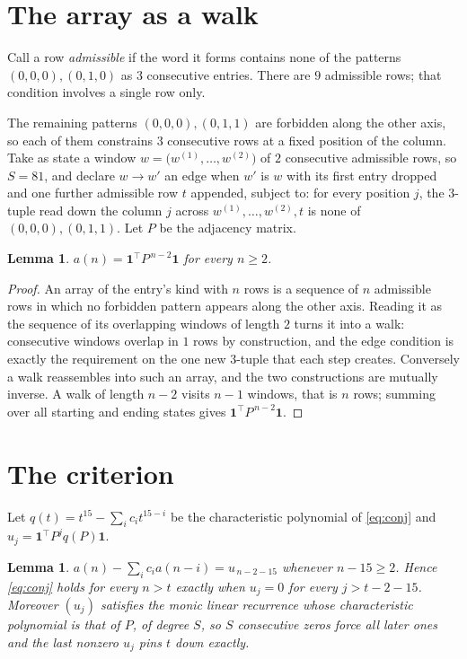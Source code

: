 \documentclass[11pt,a4paper]{article}
\theoremstyle{plain}
\newtheorem{lemma}[theorem]{Lemma}
\theoremstyle{definition}
\begin{document}
\section{The array as a walk}

Call a row \emph{admissible} if the word it forms contains none of the patterns
$(0,0,0), (0,1,0)$ as $3$ consecutive entries. There are $9$ admissible rows; that condition
involves a single row only.

The remaining patterns $(0,0,0), (0,1,1)$ are forbidden along the other axis, so each of them
constrains $3$ consecutive rows at a fixed position of the column. Take as state a
window $w=\bigl(w^{(1)},\dots,w^{(2)}\bigr)$ of $2$ consecutive admissible
rows, so $S=81$, and declare $w\to w'$ an edge when $w'$ is $w$ with its first entry
dropped and one further admissible row $t$ appended, subject to: for every position
$j$, the $3$-tuple read down the column $j$ across $w^{(1)},\dots,w^{(2)},t$
is none of $(0,0,0), (0,1,1)$. Let $P$ be the adjacency matrix.

\begin{lemma}\label{lem:walk}
$a(n)=\mathbf{1}^{\!\top}P^{\,n-2}\mathbf{1}$ for every $n\ge2$.
\end{lemma}

\begin{proof}
An array of the entry's kind with $n$ rows is a sequence of $n$ admissible rows in
which no forbidden pattern appears along the other axis. Reading it as the sequence of its
overlapping windows of length $2$ turns it into a walk: consecutive windows overlap in
$1$ rows by construction, and the edge condition is exactly the requirement on the one
new $3$-tuple that each step creates. Conversely a walk reassembles into such an array,
and the two constructions are mutually inverse. A walk of length $n-2$ visits $n-1$
windows, that is $n$ rows; summing over all starting and ending states gives
$\mathbf{1}^{\!\top}P^{\,n-2}\mathbf{1}$.
\end{proof}

\section{The criterion}

Let $q(t)=t^{15}-\sum_i c_i t^{15-i}$ be the characteristic polynomial of
\eqref{eq:conj} and $u_j=\mathbf{1}^{\!\top}P^{j}q(P)\mathbf{1}$.

\begin{lemma}\label{lem:crit}
$a(n)-\sum_i c_i a(n-i)=u_{\,n-2-15}$ whenever $n-15\ge2$. Hence
\eqref{eq:conj} holds for every $n>t$ exactly when $u_j=0$ for every
$j>t-2-15$. Moreover $(u_j)$ satisfies the monic linear recurrence whose
characteristic polynomial is that of $P$, of degree $S$, so $S$ consecutive zeros force all
later ones and the last nonzero $u_j$ pins $t$ down exactly.
\end{lemma}
\end{document}
